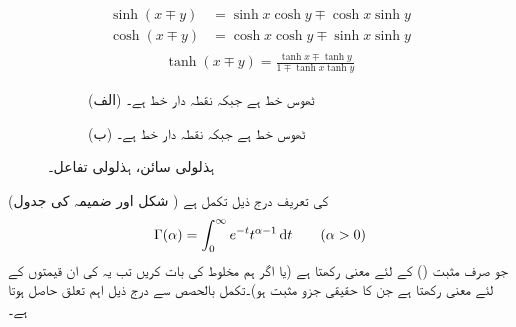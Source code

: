\begin{gather}
\begin{aligned}
\sinh(x\mp y)&=\sinh x\cosh y\mp \cosh x\sinh y\\
\cosh(x\mp y)&=\cosh x\cosh y\mp \sinh x\sinh y
\end{aligned}
\end{gather}
%
\begin{align}
\tanh(x\mp y)=\frac{\tanh x\mp \tanh y}{1\mp \tanh x\tanh y}
\end{align}
%
\begin{figure}
\centering
\begin{subfigure}{0.5\textwidth}
\centering
{}
\caption*{(الف) ٹھوس خط  ہے جبکہ نقطہ دار خط  ہے۔}
\end{subfigure}%
\begin{subfigure}{0.5\textwidth}
\centering
{}
\caption*{(ب) ٹھوس خط  ہے جبکہ نقطہ دار خط  ہے۔}
\end{subfigure}%
\caption{ہذلولی سائن، ہذلولی تفاعل۔}
\label{شکل_ضمیمہ_مفید_ہذلولی_تفاعل}
\end{figure}
 (شکل  اور ضمیمہ  کی جدول )  کی تعریف درج ذیل تکمل ہے
\begin{align}\label{مساوات_ضمیمہ_گیما_تکمل_الف}
\Gamma(\alpha)=\int_{0}^{\infty} e^{-t}t^{\alpha-1}\dif t \quad \quad (\alpha>0)
\end{align}
جو صرف مثبت () کے لئے معنی رکھتا ہے (یا اگر ہم مخلوط  کی بات کریں تب یہ  کی ان قیمتوں کے لئے معنی رکھتا ہے جن  کا حقیقی جزو مثبت ہو)۔تکمل بالحصص سے درج ذیل اہم تعلق حاصل ہوتا ہے۔
